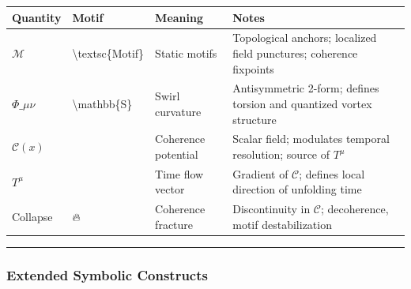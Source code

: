 \documentclass[
  11pt,
]{article}
\begin{document}
\begin{longtable}[]{@{}
  >{\raggedright\arraybackslash}p{}
  >{\raggedright\arraybackslash}p{}
  >{\raggedright\arraybackslash}p{}
  >{\raggedright\arraybackslash}p{}@{}}
\toprule\noalign{}
\begin{minipage}[b]{\linewidth}\raggedright
Quantity
\end{minipage} & \begin{minipage}[b]{\linewidth}\raggedright
Motif
\end{minipage} & \begin{minipage}[b]{\linewidth}\raggedright
Meaning
\end{minipage} & \begin{minipage}[b]{\linewidth}\raggedright
Notes
\end{minipage} \\
\midrule\noalign{}
\endhead
\bottomrule\noalign{}
\endlastfoot
\(\mathcal{M}\) & \textbackslash textsc\{Motif\} & Static motifs &
Topological anchors; localized field punctures; coherence fixpoints \\
\(\Phi\_{\mu\nu}\) & \textbackslash mathbb\{S\} & Swirl curvature &
Antisymmetric 2-form; defines torsion and quantized vortex structure \\
\(\mathcal{C}(x)\) & 💬 & Coherence potential & Scalar field; modulates
temporal resolution; source of \(T^\mu\) \\
\(T^\mu\) & 🫧 & Time flow vector & Gradient of \(\mathcal{C}\); defines
local direction of unfolding time \\
Collapse & 🔥 & Coherence fracture & Discontinuity in \(\mathcal{C}\);
decoherence, motif destabilization \\
\end{longtable}

\begin{center}\rule{0.5\linewidth}{0.5pt}\end{center}

\subsubsection{\texorpdfstring{\textbf{Extended Symbolic
Constructs}}{Extended Symbolic Constructs}}\label{extended-symbolic-constructs}
\end{document}

